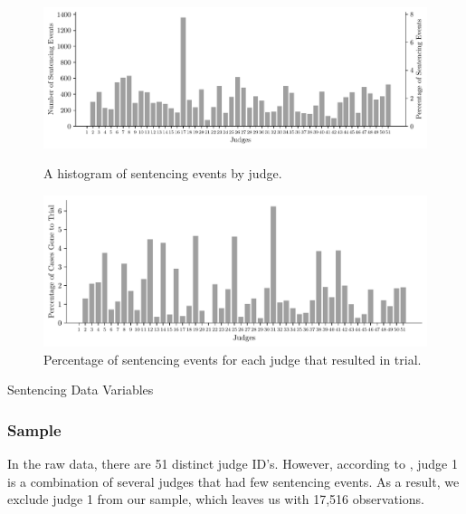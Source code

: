 \documentclass[11pt, oneside]{article}   	%
\theoremstyle{ModifiedStyle}
\begin{document}
		\begin{figure}[H]
			\centering
			\vspace{-2mm}
			\begin{minipage}{\textwidth}
				\vspace{-0mm}
				\centering
				\includegraphics[scale=0.75]{Figures/Judge_Histogram}
				\vspace{-4mm}
				\caption{A histogram of sentencing events by judge.}
				\label{Figure_Hester_Data_Judge_Histogram}
			\end{minipage}
			\begin{minipage}{\textwidth}
				\vspace{-0.5mm}
				\centering
				\includegraphics[scale=0.75]{Figures/Judge_Trial_Percentage_Histogram}
				\vspace{-4mm}
				\caption{Percentage of sentencing events for each judge that resulted in trial.}
				\label{Figure_Hester_Data_Judge_Trial_Percentage_Histogram}
			\end{minipage}
		\end{figure}

    \begin{table}[H]
      \caption{Sentencing Data Variables}
      \label{sent-vars}
      
    \end{table}

    \subsubsection{Sample}
      In the raw data, there are 51 distinct judge ID's. However, according to \cite{hester2017conditional}, judge 1 is a combination of several judges that had few sentencing events. As a result, we exclude judge 1 from our sample, which leaves us with 17,516 observations.
\end{document}
